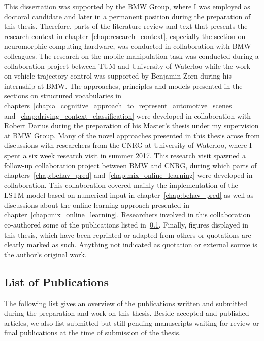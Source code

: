 This dissertation was supported by the \ac{BMW} Group, where I was employed as doctoral candidate and later in a permanent position during the preparation of this thesis.
Therefore, parts of the literature review and text that presents the research context in chapter~\ref{chap:research_context}, especially the section on neuromorphic computing hardware, was conducted in collaboration with \ac{BMW} colleagues.
The research on the mobile manipulation task was conducted during a collaboration project between \ac{TUM} and University of Waterloo while the work on vehicle trajectory control was supported by Benjamin Zorn during his internship at \ac{BMW}.
The approaches, principles and models presented in the sections on structured vocabularies in chapters~\ref{chap:a_cognitive_approach_to_represent_automotive_scenes} and~\ref{chap:driving_context_classification} were developed in collaboration with Robert Darius during the preparation of his Master's thesis \citep{Darius2018} under my supervision at \ac{BMW} Group.
Many of the novel approaches presented in this thesis arose from discussions with researchers from the \ac{CNRG} at University of Waterloo, where I spent a six week research visit in summer 2017.
This research visit spawned a follow-up collaboration project between \ac{BMW} and \ac{CNRG}, during which parts of chapters~\ref{chap:behav_pred} and~\ref{chap:mix_online_learning} were developed in collaboration.
This collaboration covered mainly the implementation of the \ac{LSTM} model based on numerical input in chapter~\ref{chap:behav_pred} as well as discussions about the online learning approach presented in chapter~\ref{chap:mix_online_learning}.
Researchers involved in this collaboration co-authored some of the publications listed in~\ref{subsec:list_of_publications}.
Finally, figures displayed in this thesis, which have been reprinted or adapted from others or quotations are clearly marked as such.
Anything not indicated as quotation or external source is the author's original work.

\subsection{List of Publications}%
\label{subsec:list_of_publications}

The following list gives an overview of the publications written and submitted during the preparation and work on this thesis.
Beside accepted and published articles, we also list submitted but still pending manuscripts waiting for review or final publications at the time of submission of the thesis.

